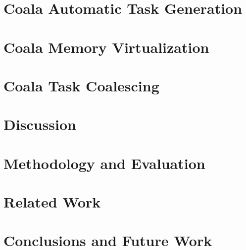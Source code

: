 \documentclass[pageno]{jpaper}
\newcommand{\sys}{Coala\xspace}
\begin{document}


\section{\sys Automatic Task Generation}
\label{sec:compiler}



\section{\sys Memory Virtualization}
\label{sec:memory_virtulaization}



\section{\sys Task Coalescing}
\label{sec:task_coalescing}



\section{Discussion}
\label{sec:discussion}



\section{Methodology and Evaluation}
\label{sec:methodology_evaluation}



\section{Related Work}
\label{sec:related_work}



\section{Conclusions and Future Work}
\label{sec:conclusions}



\newpage





\end{document}
